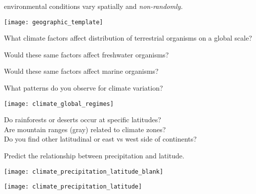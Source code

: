 \documentclass[t]{beamer}
\begin{document}

\begin{frame}[t,plain]{ environmental conditions vary spatially and \emph{non-randomly.}}
	\begin{center}
		\texttt{[image: geographic\_template]}
	\end{center}
\end{frame}

\begin{frame}[t,plain]
	\hangpara What climate factors affect distribution of terrestrial organisms on a global scale?

	\hangpara Would these same factors affect freshwater organisms?

	\hangpara Would these same factors affect marine organisms?
\end{frame}


\begin{frame}[t,plain]{What patterns do you observe for climate variation?}

	\vspace{-0.5\baselineskip}
	\begin{center}
		\texttt{[image: climate\_global\_regimes]}
	\end{center}
	
	\vspace{-1.5\baselineskip}
	\hangpara Do rainforests or deserts occur at specific latitudes?\\Are mountain ranges (gray) related to climate zones?\\Do you find other latitudinal or east vs west side of continents?
	
\end{frame}

\begin{frame}[t,plain]{Predict the relationship between precipitation and latitude.}

	\begin{center}
		\texttt{[image: climate\_precipitation\_latitude\_blank]}
	\end{center}

\end{frame}

\begin{frame}[t,plain]

	\begin{center}
		\texttt{[image: climate\_precipitation\_latitude]}
	\end{center}

\end{frame}
\end{document}
